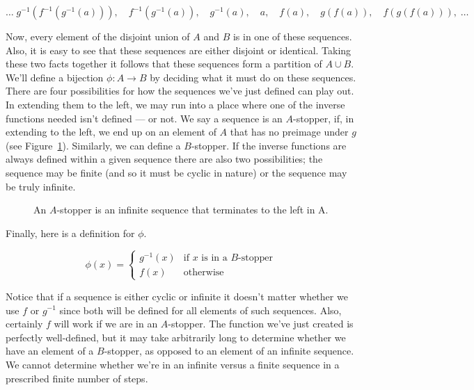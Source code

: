 \[
\ldots \; g^{-1}(f^{-1}(g^{-1}(a))), \quad f^{-1}(g^{-1}(a)), \quad g^{-1}(a), \quad a, \quad  f(a), \quad  g(f(a)), \quad f(g(f(a))),\; \ldots \]

Now, every element of the disjoint union of $A$ and $B$ is in one of these
sequences. Also, it is easy to see that these sequences are either disjoint
or identical. Taking these two facts together it follows that these sequences
form a partition of $A \cup B$.  We'll define a bijection  
$\phi : A \longrightarrow B$ by deciding what it must do on these 
sequences.  There are four possibilities for how the sequences we've 
just defined can play out. In extending them to the left, we may run 
into a place where one of the inverse functions needed isn't 
defined --- or not.  We say a sequence is an 
$A$-stopper, if, in extending to the left, we end 
up on an element of $A$ that has
no preimage under $g$ (see Figure~\ref{fig:A-stopper}).  Similarly, 
we can define a $B$-stopper.
If the inverse functions are always defined within a given sequence there are
also two possibilities; the sequence may be finite (and so it must be cyclic in
nature) or the sequence may be truly infinite.

\begin{figure}[!hbtp]
\begin{center}

\end{center}
\caption[An \emph{A}-stopper in the proof of C-B-S.]{An $A$-stopper
is an infinite sequence that terminates to the left in A.}
\label{fig:A-stopper} 
\end{figure}


Finally, here is a definition for $\phi$.

\[ \phi(x) =  \left\{ \begin{array}{cl} g^{-1}(x) & \mbox{if $x$ is in a $B$-stopper} \\ f(x) & \mbox{otherwise} \end{array} \right. \]

Notice that if a sequence is either cyclic or infinite it doesn't matter
whether we use $f$ or $g^{-1}$ since both will be 
defined for all elements of such
sequences.  Also, certainly $f$ will work if we are in an $A$-stopper.  
The function  we've just created is perfectly well-defined, but it may take
arbitrarily long to determine whether we have an element of a $B$-stopper, as
opposed to an element of an infinite sequence.  We cannot determine whether
we're in an infinite versus a finite sequence in a prescribed finite number of
steps.


